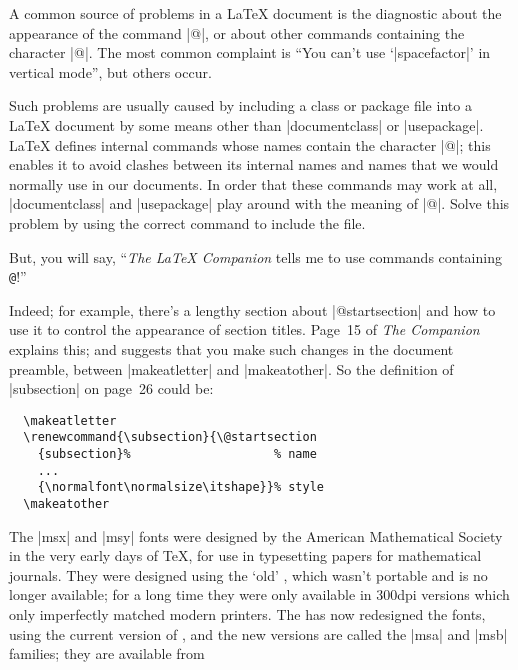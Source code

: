 \begin{changemargin}{-1cm}{-1cm}

A common source of problems in a \LaTeX{} document is the diagnostic
about the appearance of the command \cs|@|, or about other commands
containing the character |@|.  The most common complaint is ``You
can't use `\cs|spacefactor|' in vertical mode'', but others occur.

Such problems are usually caused by including a \LaTeXe{} class or
package file into a \LaTeX{} document by some means other than
\cs|documentclass| or \cs|usepackage|.  \LaTeX{} defines internal
commands whose names contain the character |@|; this enables it to
avoid clashes between its internal names and names that we would
normally use in our documents.  In order that these commands may work
at all, \cs|documentclass| and \cs|usepackage| play around with the
meaning of |@|.  Solve this problem by using the correct command to
include the file.

But, you will say, ``\emph{The \LaTeX{} Companion} tells me to use
commands containing \texttt{@}!''

Indeed; for example, there's a lengthy section about
\cs|@startsection| and how to use it to control the appearance of
section titles.  Page~15 of \emph{The Companion} explains this; and
suggests that you make such changes in the document preamble, between
\cs|makeatletter| and \cs|makeatother|.  So the definition of
\cs|subsection| on page~26 could be:

\begin{verbatim}
  \makeatletter
  \renewcommand{\subsection}{\@startsection
    {subsection}%                    % name
    ...
    {\normalfont\normalsize\itshape}}% style
  \makeatother
\end{verbatim}


The |msx| and |msy| fonts were designed by the American Mathematical
Society in the very early days of \TeX{}, for use in typesetting
papers for mathematical journals.  They were designed using the `old'
\MF{}, which wasn't portable and is no longer available; for a long
time they were only available in 300dpi versions which only
imperfectly matched modern printers.  The  has now redesigned the
fonts, using the current version of \MF{}, and the new versions are
called the |msa| and |msb| families; they are available from


\end{changemargin}
